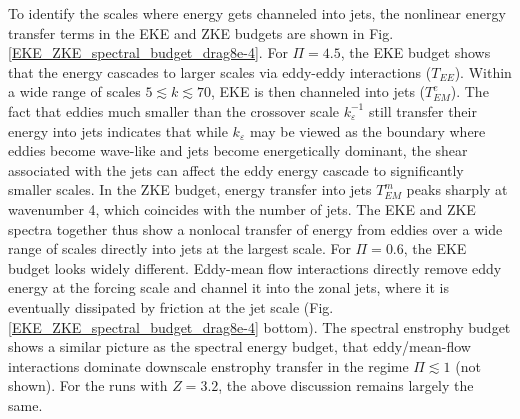 \documentclass{jfm}
\begin{document}
To identify the scales where energy gets channeled into jets, the nonlinear 
energy transfer terms in the EKE and ZKE budgets are shown in Fig. \ref{EKE_ZKE_spectral_budget_drag8e-4}.
For $\Pi=4.5$, the EKE budget shows that the energy cascades to larger scales
via eddy-eddy interactions ($T_{EE}$). Within a wide range 
of scales $5\apprle k\apprle70$, EKE is then channeled into jets 
($T^e_{EM}$). The fact that eddies much smaller
than the crossover scale $k_{\varepsilon}^{-1}$ still transfer their
energy into jets indicates that while $k_{\varepsilon}$ may be viewed as the boundary where
eddies become wave-like and jets become energetically dominant, the shear
associated with the jets can affect the eddy energy cascade to significantly smaller scales.
In the ZKE budget, energy transfer into jets $T_{EM}^{m}$ peaks
sharply at wavenumber 4, which coincides with the number of jets. The
EKE and ZKE spectra together thus show a nonlocal transfer of energy from
eddies over a wide range of scales directly into jets at the largest scale.
For $\Pi=0.6$, the EKE budget looks widely different.
Eddy-mean flow interactions directly remove eddy energy at the forcing scale and   
channel it into the zonal jets, where it is eventually dissipated by friction
at the jet scale (Fig. \ref{EKE_ZKE_spectral_budget_drag8e-4} bottom).
The spectral enstrophy budget shows a similar picture as the 
spectral energy budget, that eddy/mean-flow interactions dominate 
downscale enstrophy transfer in the regime $\Pi\apprle 1$ (not shown).
For the runs with $Z=3.2$, the above discussion remains largely the
same.

\end{document}
